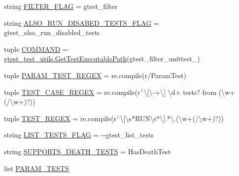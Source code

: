 \begin{DoxyCompactItemize}
\item 
string \hyperlink{namespacegtest__filter__unittest_a90fceef31e3329f712cd41244c5e923d}{F\+I\+L\+T\+E\+R\+\_\+\+F\+L\+A\+G} = \textquotesingle{}gtest\+\_\+filter\textquotesingle{}
\item 
string \hyperlink{namespacegtest__filter__unittest_aa2da713fbaa08fdbaa7cd78c45974edf}{A\+L\+S\+O\+\_\+\+R\+U\+N\+\_\+\+D\+I\+S\+A\+B\+E\+D\+\_\+\+T\+E\+S\+T\+S\+\_\+\+F\+L\+A\+G} = \textquotesingle{}gtest\+\_\+also\+\_\+run\+\_\+disabled\+\_\+tests\textquotesingle{}
\item 
tuple \hyperlink{namespacegtest__filter__unittest_a37a3f33245e16e9733ae3568e623b837}{C\+O\+M\+M\+A\+N\+D} = \hyperlink{namespacegtest__test__utils_a1bdf3cac86afa675ed37629b183048e9}{gtest\+\_\+test\+\_\+utils.\+Get\+Test\+Executable\+Path}(\textquotesingle{}gtest\+\_\+filter\+\_\+unittest\+\_\+\textquotesingle{})
\item 
tuple \hyperlink{namespacegtest__filter__unittest_a6354bb68724bdd8c64b95b8c3c863ba4}{P\+A\+R\+A\+M\+\_\+\+T\+E\+S\+T\+\_\+\+R\+E\+G\+E\+X} = re.\+compile(r\textquotesingle{}/Param\+Test\textquotesingle{})
\item 
tuple \hyperlink{namespacegtest__filter__unittest_a25a06e9972778e27d6868f141a1e3c3f}{T\+E\+S\+T\+\_\+\+C\+A\+S\+E\+\_\+\+R\+E\+G\+E\+X} = re.\+compile(r\textquotesingle{}$^\wedge$\textbackslash{}\mbox{[}\textbackslash{}-\/+\textbackslash{}\mbox{]} \textbackslash{}d+ tests? from (\textbackslash{}w+(/\textbackslash{}w+)?)\textquotesingle{})
\item 
tuple \hyperlink{namespacegtest__filter__unittest_a4f2249fe4f1b7360c2fe2304a81f9e51}{T\+E\+S\+T\+\_\+\+R\+E\+G\+E\+X} = re.\+compile(r\textquotesingle{}$^\wedge$\textbackslash{}\mbox{[}\textbackslash{}s$\ast$R\+U\+N\textbackslash{}s$\ast$\textbackslash{}\mbox{]}.$\ast$\textbackslash{}.(\textbackslash{}w+(/\textbackslash{}w+)?)\textquotesingle{})
\item 
string \hyperlink{namespacegtest__filter__unittest_a9b3bb8eda9c6b1716e992d433b1e586c}{L\+I\+S\+T\+\_\+\+T\+E\+S\+T\+S\+\_\+\+F\+L\+A\+G} = \textquotesingle{}-\/-\/gtest\+\_\+list\+\_\+tests\textquotesingle{}
\item 
string \hyperlink{namespacegtest__filter__unittest_a660f467579ec78f8f856b588c6f6f270}{S\+U\+P\+P\+O\+R\+T\+S\+\_\+\+D\+E\+A\+T\+H\+\_\+\+T\+E\+S\+T\+S} = \textquotesingle{}Has\+Death\+Test\textquotesingle{}
\item 
list \hyperlink{namespacegtest__filter__unittest_a4c414863f1e2e9ac993ce4afda33f6b9}{P\+A\+R\+A\+M\+\_\+\+T\+E\+S\+T\+S}

\end{DoxyCompactItemize}
